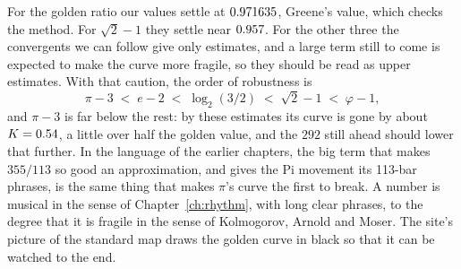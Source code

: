 For the golden ratio our values settle at $0.971635$, Greene's value, which checks the method. For $\sqrt2 - 1$ they settle near $0.957$. For the other three the convergents we can follow give only estimates, and a large term still to come is expected to make the curve more fragile, so they should be read as upper estimates. With that caution, the order of robustness is
\[
\pi - 3 \;<\; e - 2 \;<\; \log_2(3/2) \;<\; \sqrt2 - 1 \;<\; \varphi - 1 ,
\]
and $\pi - 3$ is far below the rest: by these estimates its curve is gone by about $K = 0.54$, a little over half the golden value, and the $292$ still ahead should lower that further. In the language of the earlier chapters, the big term that makes $355/113$ so good an approximation, and gives the Pi movement its 113-bar phrases, is the same thing that makes $\pi$'s curve the first to break. A number is musical in the sense of Chapter~\ref{ch:rhythm}, with long clear phrases, to the degree that it is fragile in the sense of Kolmogorov, Arnold and Moser. The site's picture of the standard map draws the golden curve in black so that it can be watched to the end.


